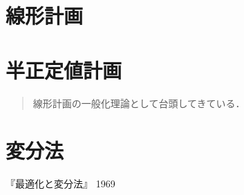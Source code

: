 \documentclass[uplatex,dvipdfmx]{jsreport}
\begin{document}
\chapter{線形計画}

\chapter{半正定値計画}

\begin{quotation}
    線形計画の一般化理論として台頭してきている．
\end{quotation}

\chapter{変分法}

\begin{thebibliography}{9}
    『最適化と変分法』
    1969 
\end{thebibliography}
\end{document}
